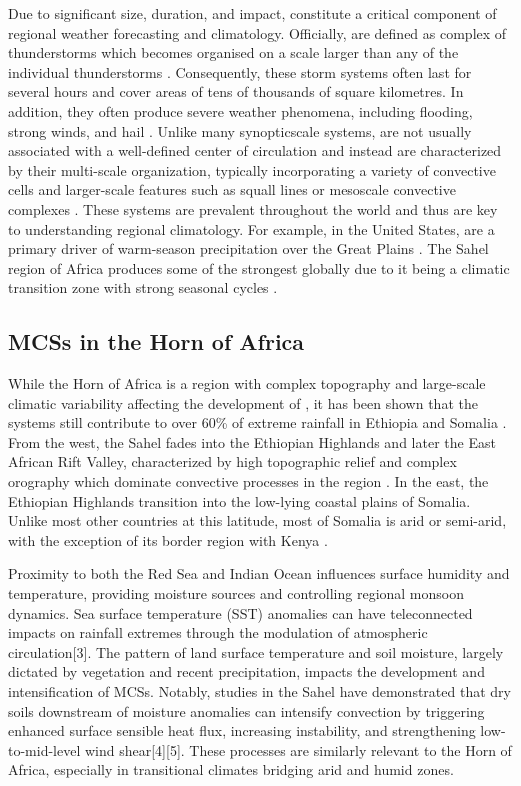 Due to significant size, duration, and impact,  constitute a critical component of regional weather forecasting and climatology. Officially,  are defined as complex of thunderstorms which becomes organised on a scale larger than any of the individual thunderstorms \citep{NOAANWS2025}. Consequently, these storm systems often last for several hours and cover areas of tens of thousands of square kilometres. In addition, they often produce severe weather phenomena, including flooding, strong winds, and hail \citep{Houze2014}. Unlike many \Gls{synopticscale} systems,  are not usually associated with a well-defined center of circulation and instead are characterized by their multi-scale organization, typically incorporating a variety of convective cells and larger-scale features such as squall lines or mesoscale convective complexes \citep{NOAANWS2025,AMS2024}. These systems are prevalent throughout the world and thus are key to understanding regional climatology. For example, in the United States,  are a primary driver of warm-season precipitation over the Great Plains \citep{Haberlie2019}. The Sahel region of Africa produces some of the strongest  globally due to it being a climatic transition zone with strong seasonal cycles \citep{Zipser2006}.

\subsection{MCSs in the Horn of Africa}

While the Horn of Africa is a region with complex topography and large-scale climatic variability affecting the development of , it has been shown that the systems still contribute to over 60\% of extreme rainfall in Ethiopia and Somalia \citep{Hill2023}. From the west, the Sahel fades into the Ethiopian Highlands and later the East African Rift Valley, characterized by high topographic relief and complex orography which dominate convective processes in the region \citep{Negash2024}. In the east, the Ethiopian Highlands transition into the low-lying coastal plains of Somalia. Unlike most other countries at this latitude, most of Somalia is arid or semi-arid, with the exception of its border region with Kenya \citep{Beck2023}.

 Proximity to both the Red Sea and Indian Ocean influences surface humidity and temperature, providing moisture sources and controlling regional monsoon dynamics. Sea surface temperature (SST) anomalies can have teleconnected impacts on rainfall extremes through the modulation of atmospheric circulation[3]. The pattern of land surface temperature and soil moisture, largely dictated by vegetation and recent precipitation, impacts the development and intensification of MCSs. Notably, studies in the Sahel have demonstrated that dry soils downstream of moisture anomalies can intensify convection by triggering enhanced surface sensible heat flux, increasing instability, and strengthening low-to-mid-level wind shear[4][5]. These processes are similarly relevant to the Horn of Africa, especially in transitional climates bridging arid and humid zones.

